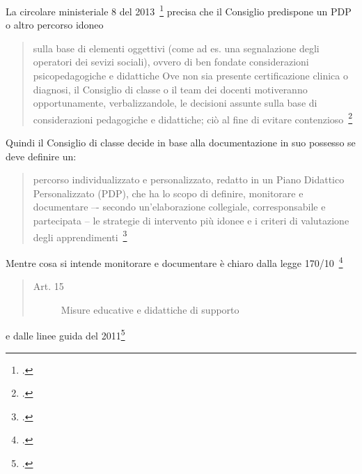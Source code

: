  La circolare ministeriale 8 del 2013~\footcite{cm8_2013} precisa che il Consiglio predispone un PDP o altro percorso idoneo
\begin{quote}
sulla base di elementi oggettivi (come ad es. una segnalazione degli operatori dei sevizi sociali), ovvero di ben fondate considerazioni psicopedagogiche e didattiche
\mancatesto
Ove non sia presente certificazione clinica o diagnosi, il Consiglio di classe o il team dei docenti
motiveranno opportunamente, verbalizzandole, le decisioni assunte sulla base di considerazioni
pedagogiche e didattiche; ciò al fine di evitare contenzioso~\footcite{cm8_2013}
\end{quote}
Quindi il Consiglio di classe decide in base alla documentazione in suo possesso se deve definire un:
\begin{quote}
percorso individualizzato e personalizzato, redatto in un Piano
Didattico Personalizzato (PDP), che ha lo scopo di definire, monitorare e documentare –- secondo
un'elaborazione collegiale, corresponsabile e partecipata -- le strategie di intervento più idonee e i
criteri di valutazione degli apprendimenti~\footcite{cm8_2013}
\end{quote}
Mentre cosa si intende 
monitorare e documentare è chiaro dalla legge 170/10~\footcite{legge170}
\begin{quote}
	\begin{description}
		\item[Art. 15] Misure educative e didattiche di supporto
	\end{description}
\end{quote}
e dalle linee guida del 2011\footcite{LineGuida2011} 
